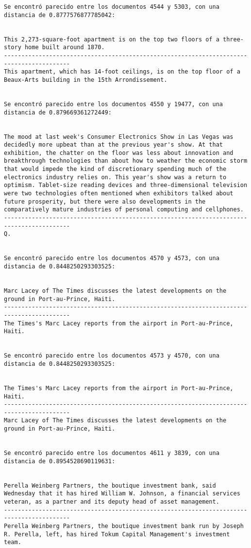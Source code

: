 \documentclass[11pt]{article}
\begin{document}
\begin{Verbatim}[commandchars=\\\{\}]
Se encontró parecido entre los documentos 4544 y 5303, con una distancia de 0.8777576877785042:


This 2,273-square-foot apartment is on the top two floors of a three-story home built around 1870.
-----------------------------------------------------------------------------------------
This apartment, which has 14-foot ceilings, is on the top floor of a Beaux-Arts building in the 15th Arrondissement.


Se encontró parecido entre los documentos 4550 y 19477, con una distancia de 0.879669361272449:


The mood at last week's Consumer Electronics Show in Las Vegas was decidedly more upbeat than at the previous year's show. At that exhibition, the chatter on the floor was less about innovation and breakthrough technologies than about how to weather the economic storm that would impede the kind of discretionary spending much of the electronics industry relies on. This year's show was a return to optimism. Tablet-size reading devices and three-dimensional television were two technologies often mentioned when exhibitors talked about future prosperity, but there were also developments in the comparatively mature industries of personal computing and cellphones.
-----------------------------------------------------------------------------------------
Q.


Se encontró parecido entre los documentos 4570 y 4573, con una distancia de 0.8448250293303525:


Marc Lacey of The Times discusses the latest developments on the ground in Port-au-Prince, Haiti.
-----------------------------------------------------------------------------------------
The Times's Marc Lacey reports from the airport in Port-au-Prince, Haiti.


Se encontró parecido entre los documentos 4573 y 4570, con una distancia de 0.8448250293303525:


The Times's Marc Lacey reports from the airport in Port-au-Prince, Haiti.
-----------------------------------------------------------------------------------------
Marc Lacey of The Times discusses the latest developments on the ground in Port-au-Prince, Haiti.


Se encontró parecido entre los documentos 4611 y 3839, con una distancia de 0.8954528690119631:


Perella Weinberg Partners, the boutique investment bank, said Wednesday that it has hired William W. Johnson, a financial services veteran, as a partner and its deputy head of asset management.
-----------------------------------------------------------------------------------------
Perella Weinberg Partners, the boutique investment bank run by Joseph R. Perella, left, has hired Tokum Capital Management's investment team.



\end{Verbatim}
\end{document}
